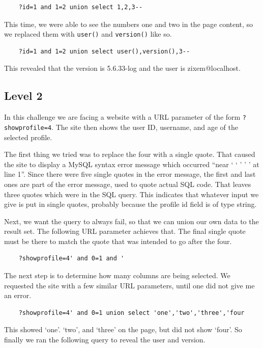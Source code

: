 \documentclass{article}
\begin{document}
\begin{verbatim}
	?id=1 and 1=2 union select 1,2,3--
\end{verbatim}

This time, we were able to see the numbers one and two in the page content, so we replaced them with \verb`user()` and \verb`version()` like so.

\begin{verbatim}
	?id=1 and 1=2 union select user(),version(),3--
\end{verbatim}

This revealed that the version is 5.6.33-log and the user is zixem@localhost.

\subsection{Level 2}

In this challenge we are facing a website with a URL parameter of the form \verb`?showprofile=4`. The site then shows the user ID, username, and age of the selected profile.

The first thing we tried was to replace the four with a single quote. That caused the site to display a MySQL syntax error message which occurred ``near ` ` ' ' ' at line 1''. Since there were five single quotes in the error message, the first and last ones are part of the error message, used to quote actual SQL code. That leaves three quotes which were in the SQL query. This indicates that whatever input we give is put in single quotes, probably because the profile id field is of type string.

Next, we want the query to always fail, so that we can union our own data to the result set. The following URL parameter achieves that. The final single quote must be there to match the quote that was intended to go after the four.

\begin{verbatim}
	?showprofile=4' and 0=1 and '
\end{verbatim}

The next step is to determine how many columns are being selected. We requested the site with a few similar URL parameters, until one did not give me an error.

\begin{verbatim}
	?showprofile=4' and 0=1 union select 'one','two','three','four
\end{verbatim}

This showed `one'. `two', and `three' on the page, but did not show `four'. So finally we ran the following query to reveal the user and version.
\end{document}
